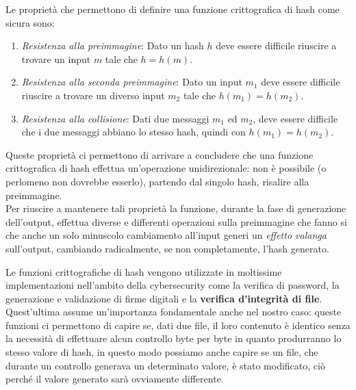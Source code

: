 Le proprietà che permettono di definire una funzione crittografica di hash come sicura sono:
\begin{enumerate}
    \item \emph{Resistenza alla preimmagine}: Dato un hash \(h\) deve essere difficile riuscire a
    trovare un input \(m\) tale che \(h = h(m)\).
    \item \emph{Resistenza alla seconda preimmagine}: Dato un input \(m_1\) deve essere difficile
    riuscire a trovare un diverso input \(m_2\) tale che \(h(m_1) = h(m_2)\).
    \item \emph{Resistenza alla collisione}: Dati due messaggi \(m_1\) ed \(m_2\), deve essere
    difficile che i due messaggi abbiano lo stesso hash, quindi con \(h(m_1) = h(m_2)\).
\end{enumerate}
Queste proprietà ci permettono di arrivare a concludere che una funzione crittografica di
hash effettua un'operazione unidirezionale: non è possibile (o perlomeno non dovrebbe esserlo),
partendo dal singolo hash, risalire alla preimmagine. \\
Per riuscire a mantenere tali proprietà la funzione, durante la fase di generazione
dell'output, effettua diverse e differenti operazioni sulla preimmagine
che fanno si che anche un solo minuscolo cambiamento all'input generi
un \emph{effetto valanga} sull'output, cambiando radicalmente, se non completamente,
l'hash generato.

Le funzioni crittografiche di hash vengono utilizzate in moltissime implementazioni
nell'ambito della cybersecurity come la verifica di password, la generazione e
validazione di firme digitali e la \textbf{verifica d'integrità di file}.
Quest'ultima assume un'importanza fondamentale anche nel nostro caso: queste funzioni
ci permettono di capire se, dati due file, il loro contenuto è identico senza
la necessità di effettuare alcun controllo byte per byte in quanto produrranno
lo stesso valore di hash, in questo modo possiamo anche capire se un file,
che durante un controllo generava un determinato valore, è stato modificato,
ciò perché il valore generato sarà ovviamente differente.



